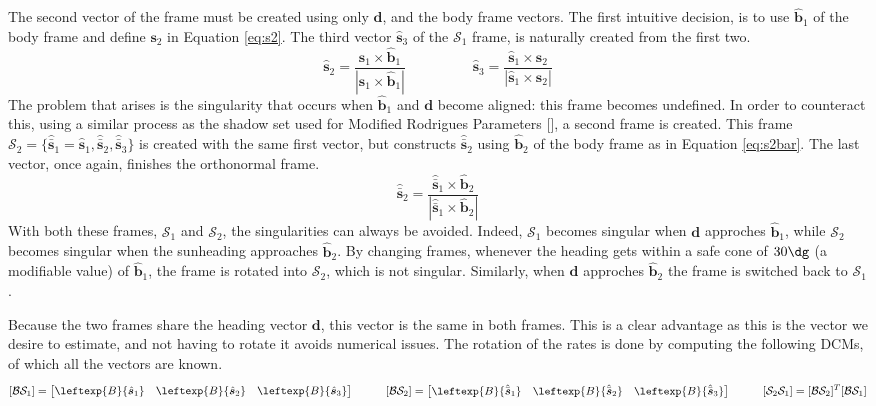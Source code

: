 \documentclass[]{BasiliskReportMemo}
\begin{document}
The second vector of the frame must be created using only $\bm d$, and the body frame vectors. The first intuitive decision, is to use $\hat{\bm b}_1$ of the body frame and define $\bm s_2$ in Equation \eqref{eq:s2}. The third vector $\hat{\bm s}_3$ of the $\mathcal{S}_1$ frame, is naturally created from the first two.
\begin{equation}\label{eq:s2}
\hat{\bm s}_2 = \frac{\hat{\bm s}_1 \times \hat{\bm b}_1}{|\hat{\bm s}_1 \times \hat{\bm b}_1|} \hspace{2cm} \hat{\bm s}_3 = \frac{\hat{\bm s}_1 \times \hat{\bm s}_2}{|\hat{\bm s}_1 \times \hat{\bm s}_2|}
\end{equation}
The problem that arises is the singularity that occurs when $\hat{\bm b}_1$ and $\bm d$ become aligned: this frame becomes undefined. In order to counteract this, using a similar process as the shadow set used for Modified Rodrigues Parameters [], a second frame is created. This frame $\mathcal{S}_2 =  \{\hat{\bar{\bm s}}_1 = \hat{\bm s}_1, \hat{\bar{\bm s}}_2 , \hat{\bar{\bm s}}_3 \}$ is created with the same first vector, but constructs $\hat{ \bar{\bm s}}_2$ using $\hat{\bm b}_2$ of the body frame as in Equation \eqref{eq:s2bar}. The last vector, once again, finishes the orthonormal frame.
\begin{equation}\label{eq:s2bar}
\hat{\bar{\bm s}}_2 = \frac{\hat{\bar{\bm s}}_1 \times \hat{\bm b}_2}{|\hat{\bar{\bm s}}_1 \times \hat{\bm b}_2|}
\end{equation}
With both these frames, $\mathcal{S}_1$ and $\mathcal{S}_2$, the singularities can always be avoided. Indeed, $\mathcal{S}_1$ becomes singular when $\bm d$ approches $\hat{\bm b}_1$, while $\mathcal{S}_2$ becomes singular when the sunheading approaches $\hat{\bm b}_2$. By changing frames, whenever the heading gets within a safe cone of $30 \dg$ (a modifiable value) of $\hat{\bm b}_1$, the frame is rotated into $\mathcal{S}_2$, which is not singular. Similarly, when $\bm d$ approches $\hat{\bm b}_2$ the frame is switched back to $\mathcal{S}_1$.

Because the two frames share the heading vector $\bm d$, this vector is the same in both frames. This is a clear advantage as this is the vector we desire to estimate, and not having to rotate it avoids numerical issues.
The rotation of the rates is done by computing the following DCMs, of which all the vectors are known.
\begin{equation}\label{eq:DCMs}
 [\mathcal{B}\mathcal{S}_1] = \begin{bmatrix} \leftexp{B}{\hat{\bm s}_1} & \leftexp{B}{\hat{\bm s}_2} & \leftexp{B}{\hat{\bm s}_3}\end{bmatrix} \hspace{1cm}  [\mathcal{B}\mathcal{S}_2] = \begin{bmatrix} \leftexp{B}{\hat{\bar{\bm s}}_1} & \leftexp{B}{\hat{\bar{\bm s}}_2} & \leftexp{B}{\hat{\bar{\bm s}}_3}\end{bmatrix} \hspace{1cm}  [\mathcal{S}_2\mathcal{S}_1] = [\mathcal{B}\mathcal{S}_2] ^T [\mathcal{B}\mathcal{S}_1] 
\end{equation}
\end{document}

